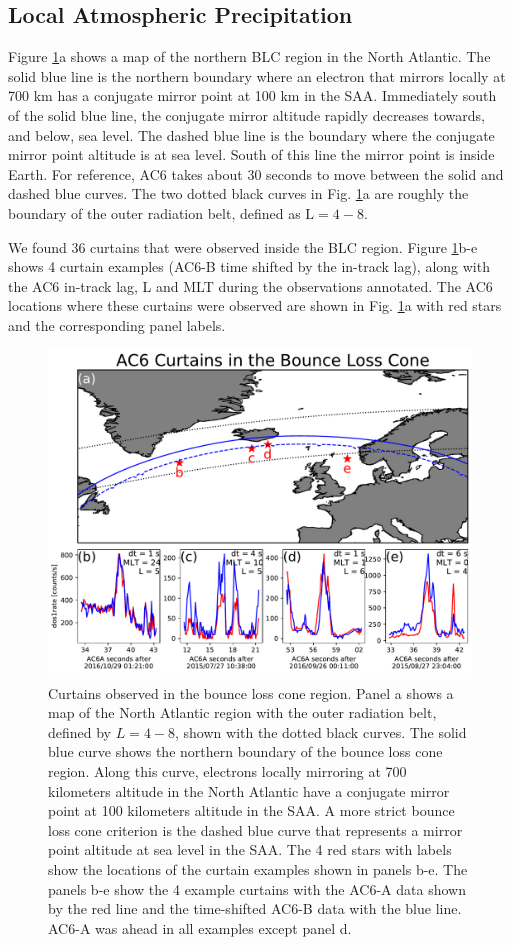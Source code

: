 \documentclass[draft]{agujournal2019}
\begin{document}
\subsection{Local Atmospheric Precipitation}
Figure \ref{fig3}a shows a map of the northern BLC region in the North Atlantic. The solid blue line is the northern boundary where an electron that mirrors locally at 700 km has a conjugate mirror point at 100 km in the SAA. Immediately south of the solid blue line, the conjugate mirror altitude rapidly decreases towards, and below, sea level. The dashed blue line is the boundary where the conjugate mirror point altitude is at sea level. South of this line the mirror point is inside Earth. For reference, AC6 takes about 30 seconds to move between the solid and dashed blue curves. The two dotted black curves in Fig. \ref{fig3}a are roughly the boundary of the outer radiation belt, defined as $\mathrm{L}=4-8$.

We found 36 curtains that were observed inside the BLC region. Figure \ref{fig3}b-e shows 4 curtain examples (AC6-B time shifted by the in-track lag), along with the AC6 in-track lag, L and MLT during the observations annotated. The AC6 locations where these curtains were observed are shown in Fig. \ref{fig3}a with red stars and the corresponding panel labels.

\begin{figure}
\includegraphics[width=\textwidth]{fig3.pdf}
\caption{Curtains observed in the bounce loss cone region. Panel a shows a map of the North Atlantic region with the outer radiation belt, defined by $L=4-8$, shown with the dotted black curves. The solid blue curve shows the northern boundary of the bounce loss cone region. Along this curve, electrons locally mirroring at 700 kilometers altitude in the North Atlantic have a conjugate mirror point at 100 kilometers altitude in the SAA. A more strict bounce loss cone criterion is the dashed blue curve that represents a mirror point altitude at sea level in the SAA. The 4 red stars with labels show the locations of the curtain examples shown in panels b-e. The panels b-e show the 4 example curtains with the AC6-A data shown by the red line and the time-shifted AC6-B data with the blue line. AC6-A was ahead in all examples except panel d.}
\label{fig3}
\end{figure}
\end{document}

